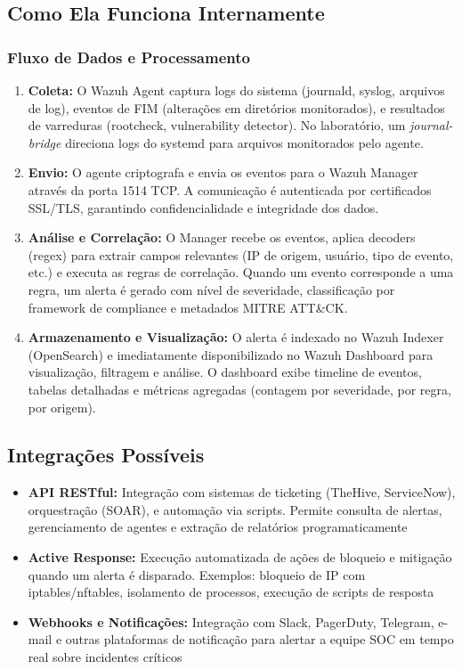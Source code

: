 \documentclass[12pt,a4paper]{article}
\begin{document}
    \subsection{Como Ela Funciona Internamente}

    \subsubsection{Fluxo de Dados e Processamento}

    \begin{enumerate}
        \item \textbf{Coleta:} O Wazuh Agent captura logs do sistema (journald, syslog, arquivos de log), eventos de FIM (alterações em diretórios monitorados), e resultados de varreduras (rootcheck, vulnerability detector). No laboratório, um \textit{journal-bridge} direciona logs do systemd para arquivos monitorados pelo agente.
        \item \textbf{Envio:} O agente criptografa e envia os eventos para o Wazuh Manager através da porta 1514 TCP. A comunicação é autenticada por certificados SSL/TLS, garantindo confidencialidade e integridade dos dados.
        \item \textbf{Análise e Correlação:} O Manager recebe os eventos, aplica decoders (regex) para extrair campos relevantes (IP de origem, usuário, tipo de evento, etc.) e executa as regras de correlação. Quando um evento corresponde a uma regra, um alerta é gerado com nível de severidade, classificação por framework de compliance e metadados MITRE ATT\&CK.
        \item \textbf{Armazenamento e Visualização:} O alerta é indexado no Wazuh Indexer (OpenSearch) e imediatamente disponibilizado no Wazuh Dashboard para visualização, filtragem e análise. O dashboard exibe timeline de eventos, tabelas detalhadas e métricas agregadas (contagem por severidade, por regra, por origem).
    \end{enumerate}

    \subsection{Integrações Possíveis}

    \begin{itemize}
        \item \textbf{API RESTful:} Integração com sistemas de ticketing (TheHive, ServiceNow), orquestração (SOAR), e automação via scripts. Permite consulta de alertas, gerenciamento de agentes e extração de relatórios programaticamente
        \item \textbf{Active Response:} Execução automatizada de ações de bloqueio e mitigação quando um alerta é disparado. Exemplos: bloqueio de IP com iptables/nftables, isolamento de processos, execução de scripts de resposta
        \item \textbf{Webhooks e Notificações:} Integração com Slack, PagerDuty, Telegram, e-mail e outras plataformas de notificação para alertar a equipe SOC em tempo real sobre incidentes críticos
    \end{itemize}
\end{document}
